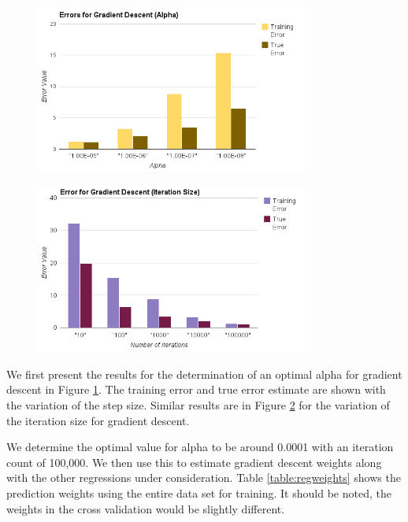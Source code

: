 \documentclass[conference]{IEEEtran}
\begin{document}
\begin{center}

\begin{figure}[ht!]
\includegraphics[width=90mm]{gdAlpha.png}
\caption{}\label{fig:alphahist}
\end{figure}

\begin{figure}[ht!]
\includegraphics[width=90mm]{gdIteration.png}
\caption{}\label{fig:iterhist}
\end{figure}
\end{center}

We first present the results for the determination of an optimal alpha for gradient descent in Figure \ref{fig:alphahist}. 
The training error and true error estimate are shown with the variation of the step size. Similar results are in Figure \ref{fig:iterhist} for the variation of the iteration size for gradient descent. 

We determine the optimal value for alpha to be around 0.0001 with an iteration count of 100,000. We then use this 
to estimate gradient descent weights along with the other regressions under consideration. Table \ref{table:regweights} shows
the prediction weights using the entire data set for training. It should be noted, the weights in the cross validation
would be slightly different. 
\end{document}
